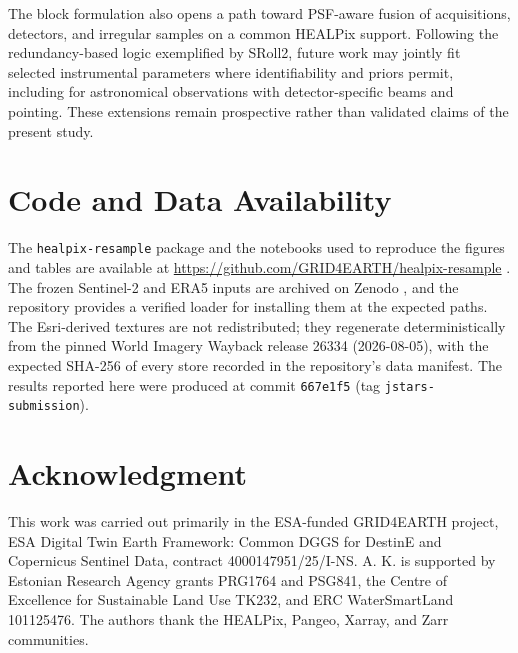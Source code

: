 \documentclass[journal]{IEEEtran}
\newcommand{\healpix}{HEALPix\xspace}
\begin{document}
The block formulation also opens a path toward PSF-aware fusion of
acquisitions, detectors, and irregular samples on a common \healpix support.
Following the redundancy-based logic exemplified by SRoll2, future work may
jointly fit selected instrumental parameters where identifiability and priors
permit, including for astronomical observations with detector-specific beams
and pointing. These extensions remain prospective rather than validated
claims of the present study.

\section*{Code and Data Availability}
The \texttt{healpix-resample} package and the notebooks used to reproduce the
figures and tables are available at
\url{https://github.com/GRID4EARTH/healpix-resample}
\cite{healpix_resample_repo}. The frozen Sentinel-2 and ERA5 inputs are
archived on Zenodo \cite{healpix_resample_paper_data}, and the repository
provides a verified loader for installing them at the expected paths. The
Esri-derived textures are not redistributed; they regenerate
deterministically from the pinned World Imagery Wayback release 26334
(2026-08-05), with the expected SHA-256 of every store recorded in the
repository's data manifest. The results reported here were produced at commit
\texttt{667e1f5} (tag \texttt{jstars-submission}).

\section*{Acknowledgment}
This work was carried out primarily in the ESA-funded GRID4EARTH project,
ESA Digital Twin Earth Framework: Common DGGS for DestinE and Copernicus
Sentinel Data, contract 4000147951/25/I-NS. A. K. is supported by Estonian
Research Agency grants PRG1764 and PSG841, the Centre of Excellence for
Sustainable Land Use TK232, and ERC WaterSmartLand 101125476. The authors
thank the HEALPix, Pangeo, Xarray, and Zarr communities.

\IEEEtriggercmd{\balance}


\end{document}
